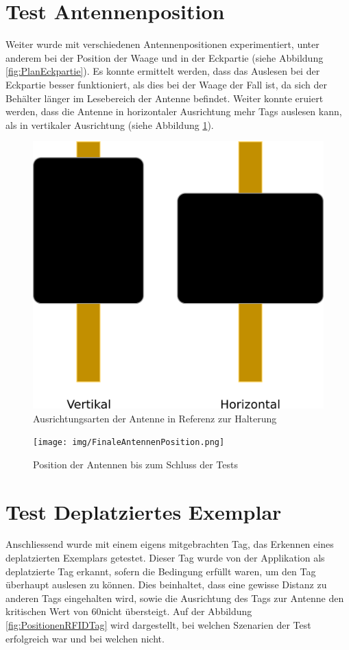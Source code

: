 \documentclass[parskip=full, a4paper]{scrartcl}
\begin{document}
\section{Test Antennenposition}
Weiter wurde mit verschiedenen Antennenpositionen experimentiert, unter anderem bei der Position der Waage und in der Eckpartie (siehe Abbildung \ref{fig:PlanEckpartie}). Es konnte ermittelt werden, dass das Auslesen bei der Eckpartie besser funktioniert, als dies bei der Waage der Fall ist, da sich der Behälter länger im Lesebereich der Antenne befindet. Weiter konnte eruiert werden, dass die Antenne in horizontaler Ausrichtung mehr Tags auslesen kann, als in vertikaler Ausrichtung (siehe Abbildung \ref{fig:AusrichtungAntenne}).

\begin{figure}[htb]
	\centering
	\includegraphics[keepaspectratio,width=0.6\linewidth]{img/AusrichtungAntenne.png}
	\caption{Ausrichtungsarten der Antenne in Referenz zur Halterung}
	\label{fig:AusrichtungAntenne}
\end{figure}

\begin{figure}[htb]
	\centering
	\texttt{[image: img/FinaleAntennenPosition.png]}
	\caption{Position der Antennen bis zum Schluss der Tests}
	\label{fig:FinalePositionAntennen}
\end{figure}

\section{Test Deplatziertes Exemplar}
Anschliessend wurde mit einem eigens mitgebrachten Tag, das Erkennen eines deplatzierten Exemplars getestet. Dieser Tag wurde von der Applikation als deplatzierte Tag erkannt, sofern die Bedingung erfüllt waren, um den Tag überhaupt auslesen zu können. Dies beinhaltet, dass eine gewisse Distanz zu anderen Tags eingehalten wird, sowie die Ausrichtung des Tags zur Antenne den kritischen Wert von 60\SIUnitSymbolDegree nicht übersteigt. Auf der Abbildung \ref{fig:PositionenRFIDTag} wird dargestellt, bei welchen Szenarien der Test erfolgreich war und bei welchen nicht.
\end{document}
